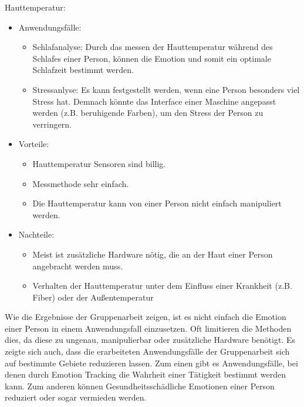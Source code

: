 \vspace{2mm}
Hauttemperatur:
\begin{itemize}
	\item Anwendungsfälle:
	\begin{itemize}
		\item Schlafanalyse: Durch das messen der Hauttemperatur während des Schlafes einer Person, können die Emotion  und somit ein optimale Schlafzeit bestimmt werden.
		\item Stressanlyse: Es kann festgestellt werden, wenn eine Person besonders viel Stress hat. Demnach könnte das Interface einer Maschine angepasst werden (z.B. beruhigende Farben), um den Stress der Person zu verringern.
	\end{itemize}
	\item Vorteile:
	\begin{itemize}
		\item Hauttemperatur Sensoren sind billig.
		\item Messmethode sehr einfach.	 
		\item Die Hauttemperatur kann von einer Person nicht einfach manipuliert werden.
	\end{itemize}
	\item Nachteile:
	\begin{itemize}
		\item Meist ist zusätzliche Hardware nötig, die an der Haut einer Person angebracht werden muss.
		\item Verhalten der Hauttemperatur unter dem Einfluss einer Krankheit (z.B. Fiber) oder der Außentemperatur
	\end{itemize}
\end{itemize}

Wie die Ergebnisse der Gruppenarbeit zeigen, ist es nicht einfach die Emotion einer Person in einem Anwendungsfall einzusetzen. Oft limitieren die Methoden dies, da diese zu ungenau, manipulierbar oder zusätzliche Hardware benötigt. Es zeigte sich auch, dass die erarbeiteten Anwendungsfälle der Gruppenarbeit sich auf bestimmte Gebiete reduzieren lassen. Zum einen gibt es Anwendungsfälle, bei denen durch Emotion Tracking die Wahrheit einer Tätigkeit bestimmt werden kann. Zum anderen können Gesundheitsschädliche Emotionen einer Person reduziert oder sogar vermieden werden. 

